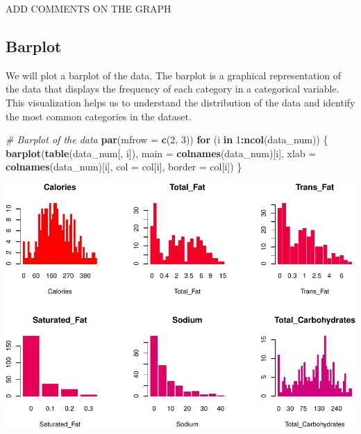 \documentclass[
]{article}
\newenvironment{Shaded}{\begin{snugshade}}{\end{snugshade}}
\newcommand{\AttributeTok}[1]{\textcolor[rgb]{0.13,0.29,0.53}{#1}}
\newcommand{\CommentTok}[1]{\textcolor[rgb]{0.56,0.35,0.01}{\textit{#1}}}
\newcommand{\ControlFlowTok}[1]{\textcolor[rgb]{0.13,0.29,0.53}{\textbf{#1}}}
\newcommand{\DecValTok}[1]{\textcolor[rgb]{0.00,0.00,0.81}{#1}}
\newcommand{\FunctionTok}[1]{\textcolor[rgb]{0.13,0.29,0.53}{\textbf{#1}}}
\newcommand{\NormalTok}[1]{#1}
\newcommand{\SpecialCharTok}[1]{\textcolor[rgb]{0.81,0.36,0.00}{\textbf{#1}}}
\begin{document}
ADD COMMENTS ON THE GRAPH

\subsection{Barplot}\label{barplot}

We will plot a barplot of the data. The barplot is a graphical
representation of the data that displays the frequency of each category
in a categorical variable. This visualization helps us to understand the
distribution of the data and identify the most common categories in the
dataset.

\begin{Shaded}
\begin{Highlighting}[]
\CommentTok{\# Barplot of the data}
\FunctionTok{par}\NormalTok{(}\AttributeTok{mfrow =} \FunctionTok{c}\NormalTok{(}\DecValTok{2}\NormalTok{, }\DecValTok{3}\NormalTok{))}
\ControlFlowTok{for}\NormalTok{ (i }\ControlFlowTok{in} \DecValTok{1}\SpecialCharTok{:}\FunctionTok{ncol}\NormalTok{(data\_num)) \{}
  \FunctionTok{barplot}\NormalTok{(}\FunctionTok{table}\NormalTok{(data\_num[, i]), }\AttributeTok{main =} \FunctionTok{colnames}\NormalTok{(data\_num)[i],}
          \AttributeTok{xlab =} \FunctionTok{colnames}\NormalTok{(data\_num)[i], }\AttributeTok{col =}\NormalTok{ col[i], }\AttributeTok{border =}\NormalTok{ col[i])}
\NormalTok{\}}
\end{Highlighting}
\end{Shaded}

\begin{center}\includegraphics{Statistical_Learning_Final_Report_files/figure-latex/barplot-1} \end{center}
\end{document}
